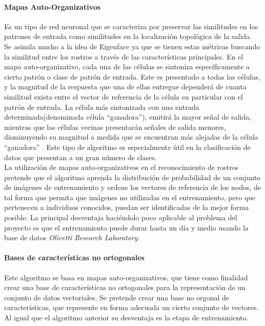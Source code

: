 \documentclass[letterpaper,12pt]{article}
\begin{document}
\paragraph{Mapas Auto-Organizativos}

Es un tipo de red neuronal que se caracteriza por preservar las similitudes en los patrones de entrada como similitudes en la localización topológica de la salida.\\
Se asimila mucho a la idea de Eigenface ya que se tienen estas métricas buscando la similitud entre los rostros a través de las características principales. 
En el mapa auto-organizativo, cada una de las células se sintoniza específicamente a cierto patrón o clase de patrón de entrada. Este es presentado a todas las células, y la magnitud de la respuesta que una de ellas entregue dependerá de cuanta similitud exista entre el vector de referencia de la célula en particular con el patrón de entrada. La célula más sintonizada con una entrada determinada(denominada célula ``ganadora''), emitirá la mayor señal de salida, mientras que las células vecinas presentarán señales de salida menores, disminuyendo su magnitud a medida que se encuentran más alejadas de la célula ``ganadora'' \cite{ElectronicoUdeC} . 
Este tipo de algoritmo es especialmente útil en la clasificación de datos que presentan a un gran número de clases.\\
La utilización de mapas auto-organizativos en el reconocimiento de rostros pretende que el algoritmo aprenda la distribución de probabilidad de un conjunto de imágenes de entrenamiento y ordene los vectores de referencia de los nodos, de tal forma que permita que imágenes no utilizadas en el entrenamiento, pero que pertenecen a individuos conocidos, puedan ser identificadas de la mejor forma posible. La principal desventaja haciéndolo poco aplicable al problema del proyecto es que el entrenamiento puede durar hasta un día y medio usando la base de datos {\textit{Olivetti Research Laboratory}.}

\paragraph{Bases de características no ortogonales}

Este algoritmo se basa en mapas auto-organizativos, que tiene como finalidad crear una base de características no ortogonales para la representación de un conjunto de datos vectoriales. Se pretende crear una base no orgonal de características, que represente en forma adecuada un cierto conjunto de vectores. Al igual que el algoritmo anterior su desventaja es la etapa de entrenamiento.
\end{document}
